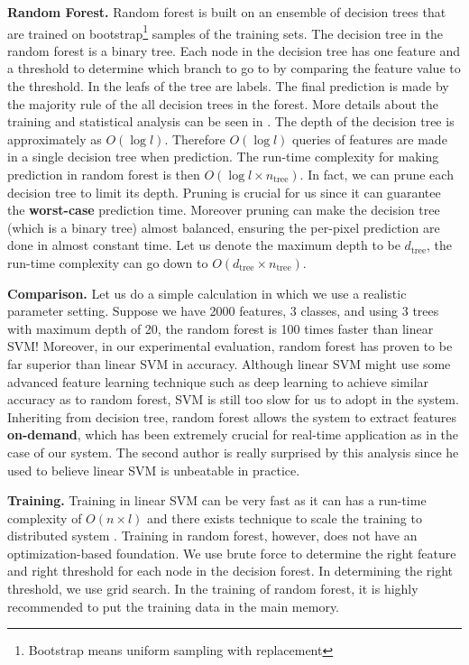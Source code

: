 \textbf{Random Forest.} Random forest is built on an ensemble of decision trees that are trained on  bootstrap\footnote{Bootstrap means uniform   sampling with replacement} samples of the training sets. The decision tree in the random forest is a binary tree. Each node in the decision tree has one feature and a threshold to determine which branch to go to by comparing the feature value to the threshold. In the leafs of the tree are labels. The final prediction is made by the majority rule of the all decision trees in the forest. More details about the training and statistical analysis can be seen in . The depth of the decision tree is approximately as $O(\log l)$. Therefore $O(\log l)$ queries of features are made in a single decision tree when prediction. The run-time complexity for making prediction in random forest is then $O(\log l \times n_{\text{tree}})$. In fact, we can prune each decision tree to limit its depth. Pruning is crucial for us since it can guarantee the \textbf{worst-case} prediction time. Moreover pruning can make the decision tree (which is a binary tree) almost balanced, ensuring the per-pixel prediction are done in almost constant time. Let us denote the maximum depth to be  $d_{\text{tree}}$, the run-time complexity can go down to $O(d_{\text{tree}}\times n_{\text{tree}})$. 


\textbf{Comparison.} Let us do a simple calculation in which we use a realistic parameter setting. Suppose we have 2000 features, 3 classes, and using 3 trees with maximum depth of 20, the random forest is 100 times faster than linear SVM! Moreover, in our experimental evaluation, random forest has proven to be far superior than linear SVM in accuracy. Although linear SVM might use some advanced feature learning technique such as deep learning to achieve similar accuracy as to random forest, SVM is still too slow for us to adopt in the system. Inheriting from decision tree, random forest allows the system to extract features \textbf{on-demand}, which has been extremely crucial for real-time application as in the case of our system. The second author  is really surprised by this analysis since he used to believe linear SVM is unbeatable in practice.  

\textbf{Training.} Training in linear SVM can be very fast as it can has a run-time complexity of $O(n\times l)$ and there exists technique to scale the training to distributed system . Training in random forest, however, does not have an optimization-based foundation. We use brute force to determine the right feature and right threshold for each node in the decision forest. In determining the right threshold, we use grid search. In the training of random forest, it is highly recommended to put the training data in the main memory. 


